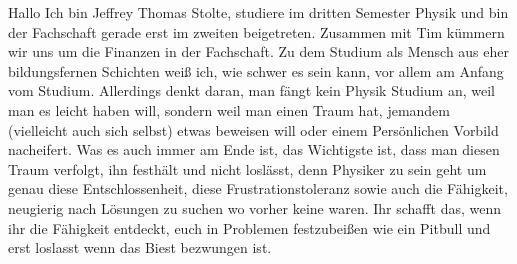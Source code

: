 \begin{multicols}{2}
{
Hallo Ich bin Jeffrey Thomas Stolte, studiere im dritten Semester Physik und bin der Fachschaft gerade erst im zweiten beigetreten.
Zusammen mit Tim kümmern wir uns um die Finanzen in der Fachschaft. Zu dem Studium als Mensch aus eher bildungsfernen Schichten weiß ich, wie schwer es sein kann, vor allem am Anfang vom Studium. Allerdings denkt daran, man fängt kein Physik Studium an, weil man es leicht haben will, sondern weil man einen Traum hat, jemandem (vielleicht auch sich selbst) etwas beweisen will oder einem Persönlichen Vorbild nacheifert. Was es auch immer am Ende ist, das Wichtigste ist, dass man diesen Traum verfolgt, ihn festhält und nicht loslässt, denn Physiker zu sein geht um genau diese Entschlossenheit, diese Frustrationstoleranz sowie auch die Fähigkeit, neugierig nach Lösungen zu suchen wo vorher keine waren. Ihr schafft das, wenn ihr die Fähigkeit entdeckt, euch in Problemen festzubeißen wie ein Pitbull und erst loslasst wenn das Biest bezwungen ist.
}


\end{multicols}
